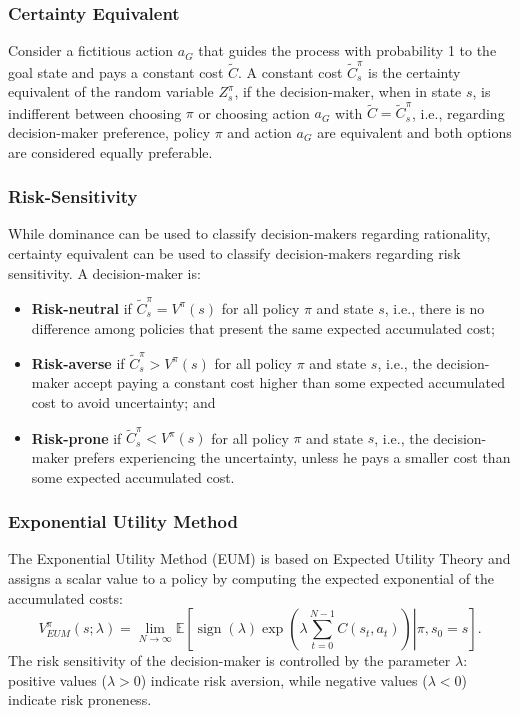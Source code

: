 \documentclass[runningheads]{llncs}
\DeclareMathOperator{\sign}{sign}
\begin{document}
\subsubsection{Certainty Equivalent} Consider a fictitious action $a_{G}$ that guides the process with probability 1 to the goal state and pays a constant cost $\widetilde{C}$. A constant cost $\widetilde{C}^{\pi}_{s}$ is the certainty equivalent of the random variable $Z^{\pi}_{s}$, if the decision-maker, when in state $s$, is indifferent between choosing $\pi$ or choosing action $a_{G}$ with $\widetilde{C} = \widetilde{C}^{\pi}_{s}$, i.e., regarding decision-maker preference, policy $\pi$ and action $a_{G}$ are equivalent and both options are considered equally preferable.

\subsubsection{Risk-Sensitivity} 
While dominance can be used to classify decision-makers regarding rationality, certainty equivalent can be used to classify decision-makers regarding risk sensitivity. A decision-maker is: 
\begin{itemize}
    \item \textbf{Risk-neutral} if $\widetilde{C}^{\pi}_{s} = V^{\pi}(s)$ for all policy $\pi$ and state $s$, i.e., there is no difference among policies that present the same expected accumulated cost;
    \item \textbf{Risk-averse} if $\widetilde{C}^{\pi}_{s} > V^{\pi}(s)$ for all policy $\pi$ and state $s$, i.e., the decision-maker accept paying a constant cost higher than some expected accumulated cost to avoid uncertainty; and
    \item \textbf{Risk-prone} if $\widetilde{C}^{\pi}_{s} < V^{\pi}(s)$ for all policy $\pi$ and state $s$, i.e., the decision-maker prefers experiencing the uncertainty, unless he pays a smaller cost than some expected accumulated cost. 
\end{itemize}

\subsubsection{Exponential Utility Method}
The Exponential Utility Method (EUM) \cite{howard1972risk,exp-utility-function} is based on Expected Utility Theory and assigns a scalar value to a policy by computing the expected exponential of the accumulated costs:
\begin{equation}
    V^\pi_{EUM}(s; \lambda) = \lim_{N \to \infty} \mathbb{E} \left[\left.
        \sign(\lambda) \exp\left(\lambda \sum_{t=0}^{N-1} C(s_t, a_t)\right) \right| \pi, s_0 = s
    \right].
\end{equation}
The risk sensitivity of the decision-maker is controlled by the parameter $\lambda$: positive values ($\lambda > 0$) indicate risk aversion, while negative values ($\lambda < 0$) indicate risk proneness. 
\end{document}
